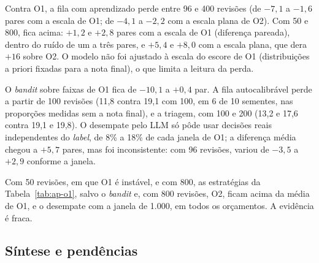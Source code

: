 Contra O1, a fila com aprendizado perde entre 96 e 400 revisões (de $-7{,}1$ a $-1{,}6$ pares com a escala de O1; de $-4{,}1$ a $-2{,}2$ com a escala plana de O2). Com 50 e 800, fica acima: $+1{,}2$ e $+2{,}8$ pares com a escala de O1 (diferença pareada), dentro do ruído de um a três pares, e $+5{,}4$ e $+8{,}0$ com a escala plana, que dera $+16$ sobre O2. O modelo não foi ajustado à escala do escore de O1 (distribuições a priori fixadas para a nota final), o que limita a leitura da perda.

O \textit{bandit} sobre faixas de O1 fica de $-10{,}1$ a $+0{,}4$ par. A fila autocalibrável perde a partir de 100 revisões (11,8 contra 19,1 com 100, em 6 de 10 sementes, nas proporções medidas sem a nota final), e a triagem, com 100 e 200 (13,2 e 17,6 contra 19,1 e 19,8). O desempate pelo LLM só pôde usar decisões reais independentes do \textit{label}, de 8\% a 18\% de cada janela de O1; a diferença média chegou a $+5{,}7$ pares, mas foi inconsistente: com 96 revisões, variou de $-3{,}5$ a $+2{,}9$ conforme a janela.

Com 50 revisões, em que O1 é instável, e com 800, as estratégias da Tabela~\ref{tab:ap-o1}, salvo o \textit{bandit} e, com 800 revisões, O2, ficam acima da média de O1, e o desempate com a janela de 1.000, em todos os orçamentos. A evidência é fraca.

\subsection{Síntese e pendências}\label{sec:e4-ap-filas-sintese}

